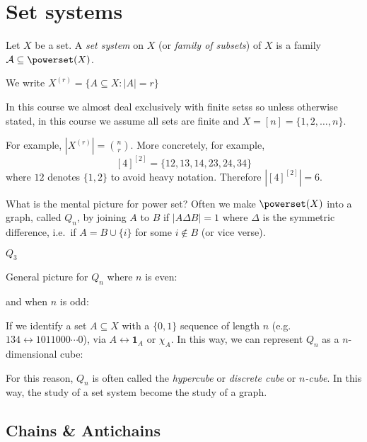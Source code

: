 \documentclass[a4paper]{article}
\begin{document}


\tableofcontents

\section{Set systems}

\begin{definition}
  Let \(X\) be a set. A \emph{set system} on \(X\) (or \emph{family of subsets}) of \(X\) is a family \(\mathcal A \subseteq \powerset (X)\).
\end{definition}

\begin{eg}
  We write \(X^{(r)} = \{A \subseteq X: |A| = r\}\)
\end{eg}

In this course we almost deal exclusively with finite setss so unless otherwise stated, in this course we assume all sets are finite and \(X = [n] = \{1, 2, \dots, n\}\).

For example, \(|X^{(r)}| = \binom{n}{r}\). More concretely, for example,
\[
  [4]^{[2]} = \{12, 13, 14, 23, 24, 34\}
\]
where \(12\) denotes \(\{1, 2\}\) to avoid heavy notation. Therefore \(|[4]^{[2]}| = 6\).

What is the mental picture for power set? Often we make \(\powerset (X)\) into a graph, called \(Q_n\), by joining \(A\) to \(B\) if \(|A \Delta B| = 1\) where \(\Delta\) is the symmetric difference, i.e.\ if \(A = B \cup \{i\}\) for some \(i \notin B\) (or vice verse).

\begin{eg}
  \(Q_3\)
\end{eg}

\begin{eg}
  General picture for \(Q_n\) where \(n\) is even:

  and when \(n\) is odd:
\end{eg}

If we identify a set \(A \subseteq X\) with a \(\{0, 1\}\) sequence of length \(n\) (e.g.\ \(134 \leftrightarrow 1011000 \cdots 0\)), via \(A \leftrightarrow \mathbf{1}_A \text{ or } \chi_A\). In this way, we can represent \(Q_n\) as a \(n\)-dimensional cube:

For this reason, \(Q_n\) is often called the \emph{hypercube} or \emph{discrete cube} or \emph{\(n\)-cube}. In this way, the study of a set system become the study of a graph.

\subsection{Chains \& Antichains}
\end{document}
